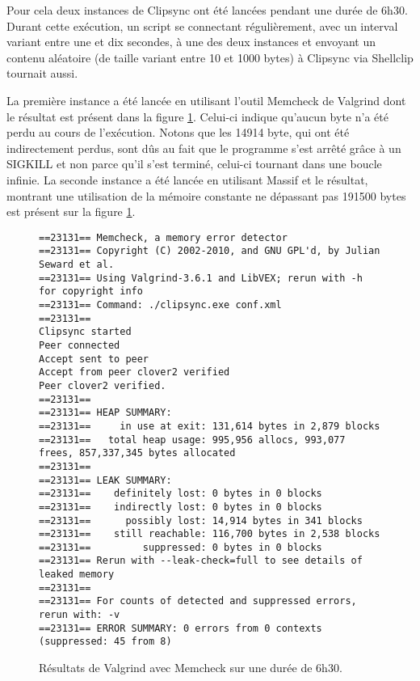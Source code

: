 Pour cela deux instances de Clipsync ont été lancées pendant une durée
de 6h30. Durant cette exécution, un script se connectant régulièrement, avec
un interval variant entre une et dix secondes, à une des deux instances et
envoyant un contenu aléatoire (de taille variant entre 10 et 1000 bytes) à
Clipsync via Shellclip tournait aussi.

La première instance a été lancée en utilisant l'outil
Memcheck de Valgrind dont le résultat est présent dans la figure
\ref{fig:memcheck}. Celui-ci indique qu'aucun byte n'a été perdu au cours
de l'exécution. Notons que les 14914 byte, qui ont été indirectement perdus,
sont dûs au fait que le programme s'est arrêté grâce à un SIGKILL et non
parce qu'il s'est terminé, celui-ci tournant dans une boucle infinie.
La seconde instance a été lancée en utilisant Massif et le résultat,
montrant une utilisation de la mémoire constante ne dépassant pas 191500
bytes est présent sur la figure \ref{fig:memcheck}.

\begin{figure}[!h]
  \centering
  \scriptsize{
\begin{verbatim}
==23131== Memcheck, a memory error detector
==23131== Copyright (C) 2002-2010, and GNU GPL'd, by Julian Seward et al.
==23131== Using Valgrind-3.6.1 and LibVEX; rerun with -h for copyright info
==23131== Command: ./clipsync.exe conf.xml
==23131==
Clipsync started
Peer connected
Accept sent to peer
Accept from peer clover2 verified
Peer clover2 verified.
==23131==
==23131== HEAP SUMMARY:
==23131==     in use at exit: 131,614 bytes in 2,879 blocks
==23131==   total heap usage: 995,956 allocs, 993,077 frees, 857,337,345 bytes allocated
==23131==
==23131== LEAK SUMMARY:
==23131==    definitely lost: 0 bytes in 0 blocks
==23131==    indirectly lost: 0 bytes in 0 blocks
==23131==      possibly lost: 14,914 bytes in 341 blocks
==23131==    still reachable: 116,700 bytes in 2,538 blocks
==23131==         suppressed: 0 bytes in 0 blocks
==23131== Rerun with --leak-check=full to see details of leaked memory
==23131==
==23131== For counts of detected and suppressed errors, rerun with: -v
==23131== ERROR SUMMARY: 0 errors from 0 contexts (suppressed: 45 from 8)
\end{verbatim}
  }
  \caption{Résultats de Valgrind avec Memcheck sur une durée de 6h30.}
  \label{fig:memcheck}
\end{figure}

